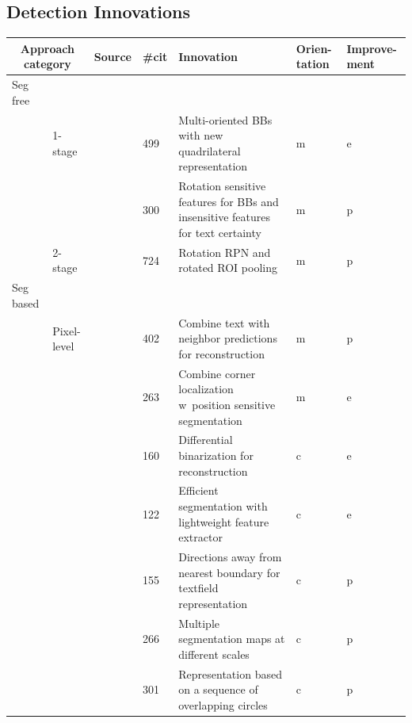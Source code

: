 \subsection{Detection Innovations}
\begin{table}[ht]
    \centering\scriptsize
    \begin{tabular}{p{}p{}p{}p{}
            p{}p{}p{}}
    \multicolumn{2}{c}{\textbf{Approach category}} & \textbf{Source} & \textbf{\#cit} &
    \textbf{Innovation} & \textbf{Orien-tation} & \textbf{Improve-ment} \\
        \toprule
        Seg free & & \\
            & 1-stage &~\cite{liao_textboxes_2018} & 499 & Multi-oriented BBs with
                new quadrilateral representation & m & e\\
            & &~\cite{liao_rotation-sensitive_2018} & 300 & Rotation sensitive features
                for BBs and insensitive features for text certainty & m & p\\
            & 2-stage &~\cite{ma_arbitrary-oriented_2018} & 724 & Rotation RPN and rotated \ac{ROI}
                pooling & m & p\\
        \midrule
        Seg based & & \\
            & Pixel-level &~\cite{deng_pixellink_2018} & 402 & Combine text with neighbor predictions for
                reconstruction & m & p\\
            & &~\cite{lyu_multi-oriented_2018} & 263 & Combine corner localization w\ position sensitive
                segmentation & m & e \\
            & &~\cite{liao_real-time_2019} & 160 & Differential binarization for
                reconstruction  & c & e \\
            & &~\cite{wang_efficient_2019} & 122 & Efficient segmentation with lightweight feature
                extractor & c & e \\
            & &~\cite{xu_textfield_2019} & 155 & Directions away
                from nearest boundary for textfield representation & c & p \\
            & &~\cite{wang_shape_2019} & 266 & Multiple segmentation maps at different scales
                & c & p\\
            & &~\cite{ferrari_textsnake_2018} & 301 & Representation based on
                a sequence of overlapping circles & c & p \\

\end{tabular}
\end{table}
